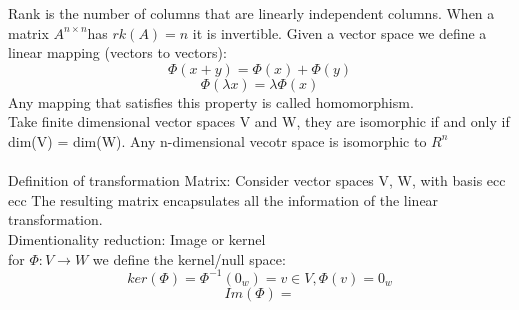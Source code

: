 \documentclass{article}
\begin{document}
Rank is the number of columns that are linearly independent columns. When a matrix $A^{n\times n} $has $rk(A)=n $ it is invertible.
Given a vector space we define a linear mapping (vectors to vectors): 
$$ \Phi(x+y) = \Phi(x)+ \Phi(y)$$ $$\Phi(\lambda x) = \lambda \Phi(x)$$
Any mapping that satisfies this property is called homomorphism.\\
Take finite dimensional vector spaces V and W, they are isomorphic if and only if dim(V) = dim(W). Any n-dimensional vecotr space is isomorphic to $R^n$\\\\
Definition of transformation Matrix: Consider vector spaces V, W, with basis ecc ecc The resulting matrix encapsulates all the information of the linear transformation.\\
Dimentionality reduction:
Image or kernel\\
for $\Phi : V \rightarrow W$ we define the kernel/null space:
$$ker(\Phi) = \Phi^{-1}(0_w) = {v \in V, \Phi(v) = 0_w}$$
$$Im(\Phi) = $$
\end{document}
